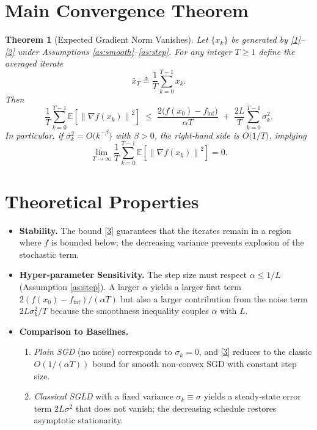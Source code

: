 \documentclass{article}
\newtheorem{theorem}{Theorem}
\newcommand{\E}{\mathbb{E}}
\newcommand{\norm}[1]{\left\lVert#1\right\rVert}
\begin{document}
\section*{Main Convergence Theorem}
\begin{theorem}[Expected Gradient Norm Vanishes]\label{thm:main}
Let $\{x_{k}\}$ be generated by \eqref{1}–\eqref{2} under Assumptions \ref{as:smooth}–\ref{as:step}. For any integer $T\ge 1$ define the averaged iterate  
\[
\bar x_{T}\triangleq \frac{1}{T}\sum_{k=0}^{T-1}x_{k}.
\]
Then  
\[
\frac{1}{T}\sum_{k=0}^{T-1}\E\!\left[\norm{\nabla f(x_{k})}^{2}\right]
\;\le\;
\frac{2\bigl(f(x_{0})-f_{\inf}\bigr)}{\alpha T}
\;+\;
\frac{2L}{T}\sum_{k=0}^{T-1}\sigma_{k}^{2}.
\tag{3}
\]
In particular, if $\sigma_{k}^{2}=O\!\bigl(k^{-\beta}\bigr)$ with $\beta>0$, the right‑hand side is $O\!\bigl(1/T\bigr)$, implying  
\[
\lim_{T\to\infty}\frac{1}{T}\sum_{k=0}^{T-1}\E\!\left[\norm{\nabla f(x_{k})}^{2}\right]=0.
\]
\end{theorem}

\section*{Theoretical Properties}
\begin{itemize}
\item \textbf{Stability.} The bound \eqref{3} guarantees that the iterates remain in a region where $f$ is bounded below; the decreasing variance prevents explosion of the stochastic term.
\item \textbf{Hyper‑parameter Sensitivity.} The step size must respect $\alpha\le1/L$ (Assumption \ref{as:step}). A larger $\alpha$ yields a larger first term $2(f(x_{0})-f_{\inf})/(\alpha T)$ but also a larger contribution from the noise term $2L\sigma_{k}^{2}/T$ because the smoothness inequality couples $\alpha$ with $L$.
\item \textbf{Comparison to Baselines.}  
    \begin{enumerate}
    \item \textit{Plain SGD} (no noise) corresponds to $\sigma_{k}=0$, and \eqref{3} reduces to the classic $O(1/(\alpha T))$ bound for smooth non‑convex SGD with constant step size.  
    \item \textit{Classical SGLD} with a fixed variance $\sigma_{k}\equiv\sigma$ yields a steady‑state error term $2L\sigma^{2}$ that does not vanish; the decreasing schedule restores asymptotic stationarity.
    \end{enumerate}
\end{itemize}
\end{document}
